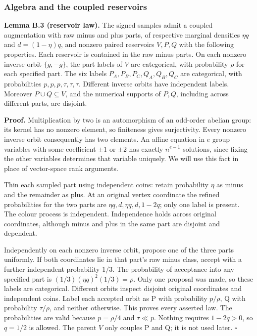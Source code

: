 \documentclass[11pt,a4paper]{article}
\newcommand{\statementstart}{\par\addvspace{6pt plus 1pt minus 1pt}\noindent}
\newcommand{\labelledparagraphstart}{\par\addvspace{3pt plus 1pt minus 1pt}\noindent}
\begin{document}
\hypertarget{algebra-and-the-coupled-reservoirs}{%
\subsubsection{Algebra and the coupled reservoirs}\label{algebra-and-the-coupled-reservoirs}}

\statementstart\textbf{Lemma B.3 (reservoir law).} The signed samples admit a coupled augmentation with raw minus and plus parts, of respective marginal densities \(\eta q\) and \(d=(1-\eta)q\), and nonzero paired reservoirs \(V,P,Q\) with the following properties. Each reservoir is contained in the raw minus parts. On each nonzero inverse orbit \(\{g,-g\}\), the part labels of \(V\) are categorical, with probability \(\rho\) for each specified part. The six labels \(P_A,P_B,P_C,Q_A,Q_B,Q_C\) are categorical, with probabilities \(p,p,p,\tau,\tau,\tau\). Different inverse orbits have independent labels. Moreover \(P\cup Q\subseteq V\), and the numerical supports of \(P,Q\), including across different parts, are disjoint.

\labelledparagraphstart\textbf{Proof.} Multiplication by two is an automorphism of an odd-order abelian group: its kernel has no nonzero element, so finiteness gives surjectivity. Every nonzero inverse orbit consequently has two elements. An affine equation in \(e\) group variables with some coefficient \(\pm1\) or \(\pm2\) has exactly \(n^{e-1}\) solutions, since fixing the other variables determines that variable uniquely. We will use this fact in place of vector-space rank arguments.

Thin each sampled part using independent coins: retain probability \(\eta\) as minus and the remainder as plus. At an original vertex coordinate the refined probabilities for the two parts are \(\eta q,d,\eta q,d,1-2q\); only one label is present. The colour process is independent. Independence holds across original coordinates, although minus and plus in the same part are disjoint and dependent.

Independently on each nonzero inverse orbit, propose one of the three parts uniformly. If both coordinates lie in that part's raw minus class, accept with a further independent probability \(1/3\). The probability of acceptance into any specified part is \((1/3)(\eta q)^2(1/3)=\rho\). Only one proposal was made, so these labels are categorical. Different orbits inspect disjoint original coordinates and independent coins. Label each accepted orbit as P with probability \(p/\rho\), Q with probability \(\tau/\rho\), and neither otherwise. This proves every asserted law. The probabilities are valid because \(p=\rho/4\) and \(\tau\ll p\). Nothing requires \(1-2q>0\), so \(q=1/2\) is allowed. The parent \(V\) only couples P and Q; it is not used later. \(\square\)
\end{document}
